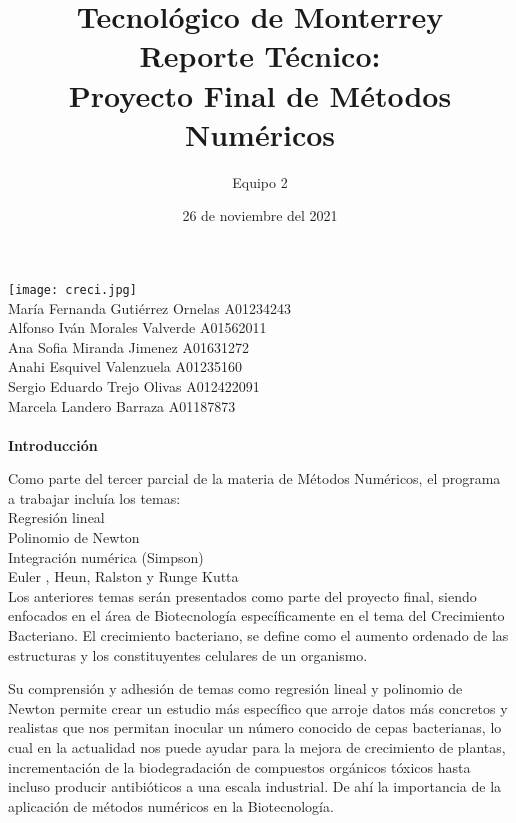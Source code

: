 \documentclass[12pt,a4paper]{article}
\begin{document}
	\title{Tecnológico de Monterrey\\Reporte Técnico:\\ Proyecto Final de Métodos Numéricos}
	\author{Equipo 2}
	\date{26 de noviembre del 2021}
	\maketitle
	\texttt{[image: creci.jpg]}\\
María Fernanda Gutiérrez Ornelas 	A01234243\\
	Alfonso Iván Morales Valverde	    A01562011\\
	Ana Sofia Miranda Jimenez          A01631272\\
	Anahi Esquivel Valenzuela          A01235160\\
	Sergio Eduardo Trejo Olivas 	    A012422091\\
	Marcela Landero Barraza                  A01187873\\\\
	
	\textbf{Introducción}
	
Como parte del tercer parcial de la materia de Métodos Numéricos, el programa a trabajar incluía los temas:\\
Regresión lineal\\
Polinomio de Newton \\
Integración numérica (Simpson)\\
Euler , Heun, Ralston y Runge Kutta\\

Los anteriores temas serán presentados como parte del proyecto final, siendo enfocados en el área de Biotecnología específicamente en el tema del Crecimiento Bacteriano. 
El crecimiento bacteriano, se define como el aumento ordenado de las estructuras y los constituyentes celulares de un organismo. 

Su comprensión y adhesión de temas como regresión lineal y polinomio de Newton permite crear un estudio más específico que arroje datos más concretos y realistas que nos permitan inocular un número conocido de cepas bacterianas, lo cual en la actualidad nos puede ayudar para la mejora de crecimiento de plantas, incrementación de la biodegradación de compuestos orgánicos tóxicos hasta incluso producir antibióticos a una escala industrial.  De ahí la importancia de la aplicación de métodos numéricos en la Biotecnología. \\\\ 
\end{document}

